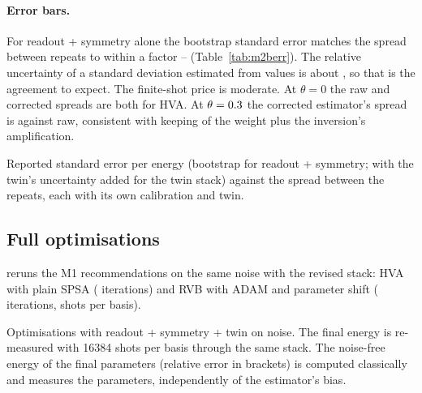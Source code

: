 \paragraph{Error bars.} For readout + symmetry alone the bootstrap standard error matches
the spread between repeats to within a factor \VMbSeRatioMin{}--\VMbSeRatioMax{}
(Table~\ref{tab:m2berr}). The relative uncertainty of a standard deviation estimated from
\VMbRepeats{} values is about \VMbSpreadRelErr{}, so that is the agreement to expect. The finite-shot
price is moderate. At $\theta=0$ the raw and corrected spreads are both
\VMbHvaFullZeroRawSpread{} for HVA. At $\theta=0.3$ the corrected
estimator's spread is \VMbHvaFullPtRoSymSpread{} against \VMbHvaFullPtRawSpread{} raw, consistent with
keeping \VMbKeptMinRoSym{} of the weight plus the inversion's amplification.

\begin{table}[H]
  \centering
  \small
  \begin{adjustbox}{max width=\linewidth}
    
  \end{adjustbox}
  \caption{Reported standard error per energy (bootstrap for readout + symmetry; with the
    twin's uncertainty added for the twin stack) against the spread between the
    \VMbRepeats{} repeats, each with its own calibration and twin.}
  \label{tab:m2berr}
\end{table}

\subsection{Full optimisations}

 reruns the M1 recommendations on the same noise with the
revised stack: HVA with plain SPSA (\VMwItersHvaSpsa{} iterations) and RVB with ADAM and
parameter shift (\VMwItersRvbPs{} iterations, \VMwShotsPerRvbPs{} shots per basis).

\begin{table}[H]
  \centering
  \small
  \begin{adjustbox}{max width=\linewidth}
    
  \end{adjustbox}
  \caption{Optimisations with readout + symmetry + twin on  noise. The final
    energy is re-measured with 16384 shots per basis through the same stack. The noise-free
    energy of the final parameters (relative error in brackets) is computed classically and
    measures the parameters, independently of the estimator's bias.}
  \label{tab:m2bvqe}
\end{table}


